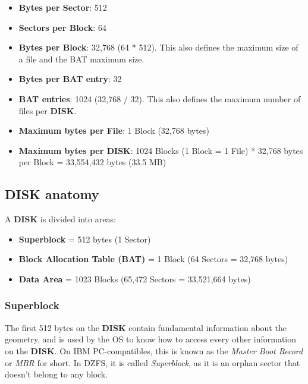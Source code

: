     \begin{itemize}
        \item \textbf{Bytes per Sector}: 512
        \item \textbf{Sectors per Block}: 64
        \item \textbf{Bytes per Block}: 32,768 (64 * 512). This also defines the
        maximum size of a file and the BAT maximum size.
        \item \textbf{Bytes per BAT entry}: 32
        \item \textbf{BAT entries}: 1024 (32,768 / 32). This also defines the 
        maximum number of files per \textbf{DISK}.
        \item \textbf{Maximum bytes per File}: 1 Block (32,768 bytes)
        \item \textbf{Maximum bytes per DISK}: 1024 Blocks (1 Block = 1 File)
        * 32,768 bytes per Block = 33,554,432 bytes (33.5 MB)
    \end{itemize}

    \subsection{DISK anatomy}

    A \textbf{DISK} is divided into areas:

    \begin{itemize}
        \item \textbf{Superblock} = 512 bytes (1 Sector)
        \item \textbf{Block Allocation Table (BAT)} = 1 Block (64 Sectors = 32,768 bytes)
        \item \textbf{Data Area} = 1023 Blocks (65,472 Sectors = 33,521,664 bytes)
    \end{itemize}

        \subsubsection{Superblock}
        The first 512 bytes on the \textbf{DISK} contain fundamental information
        about the geometry, and is used by the OS to know how to access every
        other information on the \textbf{DISK}. On IBM PC-compatibles, this is
        known as the \textit{Master Boot Record} or \textit{MBR} for short. In
        DZFS, it is called \textit{Superblock}, as it is an orphan sector that
        doesn't belong to any block.

